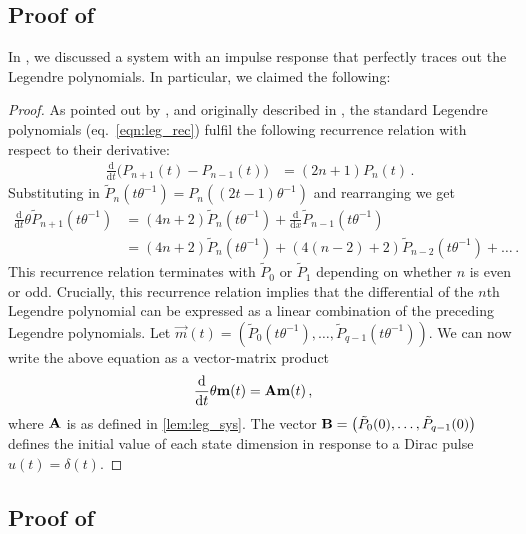\subsection{Proof of }
\label{app:leg_sys_proof}

In , we discussed a \LTI system with an impulse response that perfectly traces out the Legendre polynomials.
In particular, we claimed the following:

\LemLegSys*

\begin{proof}
As pointed out by \citet[Appendix B.1.1]{gu2020hippo}, and originally described in \citet[Chapter 12.2, p.~751]{arfken2005mathematical}, the standard Legendre polynomials (eq.~\ref{eqn:leg_rec}) fulfil the following recurrence relation with respect to their derivative:
\begin{align*}
	\frac{\mathrm{d}}{\mathrm{d}t} \big( P_{n + 1}(t) - P_{n - 1}(t) \big) &= (2n + 1) P_n(t) \,.
\end{align*}
Substituting in $\tilde P_n(t \theta^{-1}) = P_n((2t - 1) \theta^{-1})$ and rearranging we get
\begin{align*}
	\frac{\mathrm{d}}{\mathrm{d}t} \theta \tilde P_{n + 1}(t \theta^{-1})
		&= (4n + 2) \tilde P_n(t \theta^{-1}) + \frac{\mathrm{d}}{\mathrm{d}x} \tilde P_{n - 1}(t \theta^{-1}) \\
		&= (4n + 2) \tilde P_n(t \theta^{-1}) + (4(n - 2) + 2) \tilde P_{n - 2}(t \theta^{-1}) + \ldots \,.
\end{align*}
This recurrence relation terminates with $\tilde P_0$ or $\tilde P_1$ depending on whether $n$ is even or odd.
Crucially, this recurrence relation implies that the differential of the $n$th Legendre polynomial can be expressed as a linear combination of the preceding Legendre polynomials.
Let $\vec m(t) = (\tilde P_0(t \theta^{-1}), \ldots, \tilde P_{q - 1}(t \theta^{-1}))$. We can now write the above equation as a vector-matrix product
\begin{align*}
	\frac{\mathrm{d}}{\mathrm{d}t} \theta \mathbf{m}(t) &= {\mathbf{A}} \mathbf{m}(t) \,,
\end{align*}
where ${\mathbf{A}}$ is as defined in \cref{lem:leg_sys}.
The vector ${\mathbf{B}} = \big( \tilde P_0(0), \ldots, \tilde P_{q - 1}(0)\big)$ defines the initial value of each state dimension in response to a Dirac pulse $u(t) = \delta(t)$. \qedhere
\end{proof}

\subsection{Proof of }

